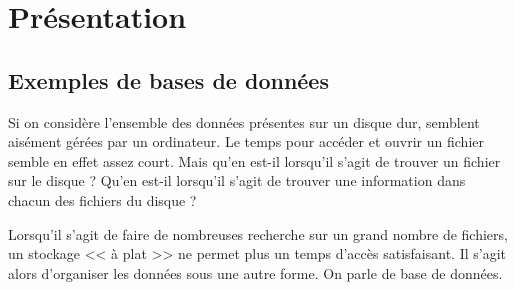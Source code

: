 \documentclass[10pt]{article}
\begin{document}

\vspace{.5cm}

\begin{savoir}

\end{savoir}



\setlength{\parskip}{0ex plus 0.2ex minus 0ex}
 \renewcommand{\contentsname}{}
 \renewcommand{\baselinestretch}{1}

\tableofcontents

 \renewcommand{\baselinestretch}{1.2}
\setlength{\parskip}{2ex plus 0.5ex minus 0.2ex}




\section{Présentation}
\subsection{Exemples de bases de données}
Si on considère l'ensemble des données présentes sur un disque dur, semblent aisément gérées par un ordinateur. Le temps pour accéder et ouvrir un fichier semble en effet assez court. Mais qu'en est-il lorsqu'il s'agit de trouver un fichier sur le disque ? Qu'en est-il lorsqu'il s'agit de trouver une information dans chacun des fichiers du disque ?

Lorsqu'il s'agit de faire de nombreuses recherche sur un grand nombre de fichiers, un stockage << à plat >> ne permet plus un temps d'accès satisfaisant. Il s'agit alors d'organiser les données sous une autre forme. On parle de base de données. 
\end{document}
